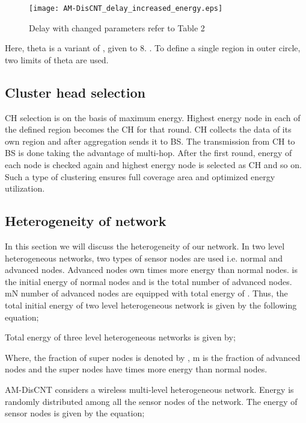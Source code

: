 \documentclass[journal]{IEEEtran}
\begin{document}
\begin{figure}[ht]
\begin{center}
\texttt{[image: AM-DisCNT\_delay\_increased\_energy.eps]}
\vspace{-0.7cm}
\caption{Delay with changed parameters refer to Table 2}
\end{center}
\end{figure}

 

  

 Here, theta is a variant of , given  to 8. .
 To define a single region in outer circle, two limits of theta are used.

\subsection{Cluster head selection}
 CH selection is on the basis of maximum energy. Highest energy node in each of the defined region becomes the CH for that round. CH collects the data of its own region and after aggregation sends it to BS. The transmission from CH to BS is done taking the advantage of multi-hop. After the first round, energy of each node is checked again and highest energy node is selected as CH and so on. Such a type of clustering ensures full coverage area and optimized energy utilization.

\subsection{Heterogeneity of network}
 In this section we will discuss the heterogeneity of our network. In two level heterogeneous networks, two types of sensor nodes are used i.e. normal and advanced nodes. Advanced nodes own  times more energy than normal nodes.  is the initial energy of normal nodes and  is the total number of advanced nodes. mN number of advanced nodes are equipped with total energy of . Thus, the total initial energy of two level heterogeneous network is given by the following equation;


 Total energy of three level heterogeneous networks is given by;
 

 Where, the fraction of super nodes is denoted by , m is the fraction of advanced nodes and the super nodes have  times more energy than normal nodes.

 AM-DisCNT considers a wireless multi-level heterogeneous network. Energy is randomly distributed among all the sensor nodes of the network. The energy of sensor nodes is given by the equation;
\end{document}
